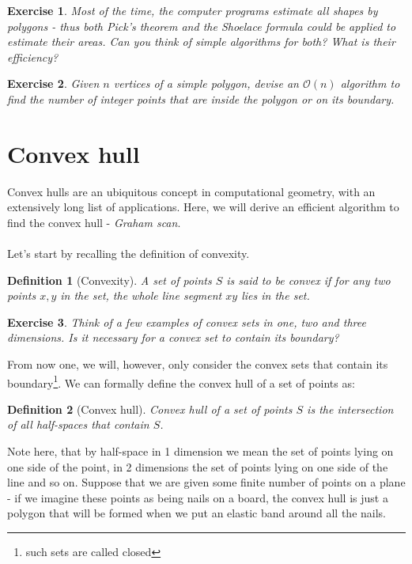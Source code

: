 \documentclass{article}
\newtheorem*{definition}{Definition}
\newtheorem{exercise}{Exercise}
\begin{document}
\begin{exercise}
Most of the time, the computer programs estimate all shapes by polygons - thus both Pick's theorem and the Shoelace formula could be applied to estimate their areas. Can you think of simple algorithms for both? What is their efficiency?
\end{exercise}

\begin{exercise}
Given $n$ vertices of a simple polygon, devise an $\mathcal{O}(n)$ algorithm to find the number of integer points that are inside the polygon or on its boundary.
\end{exercise}

\section*{Convex hull}
Convex hulls are an ubiquitous concept in computational geometry, with an extensively long list of applications. Here, we will derive an efficient algorithm to find the convex hull - \textit{Graham scan}. \\\\
\noindent Let's start by recalling the definition of convexity.

\begin{definition}[Convexity]
A set of points $S$ is said to be \textit{convex} if for any two points $x, y$ in the set, the whole line segment $xy$ lies in the set.
\end{definition}

\begin{exercise}
Think of a few examples of convex sets in one, two and three dimensions. Is it necessary for a convex set to contain its boundary?
\end{exercise}

\noindent From now one, we will, however, only consider the convex sets that contain its boundary\footnote{such sets are called closed}. We can formally define the convex hull of a set of points as:

\begin{definition}[Convex hull]
Convex hull of a set of points $S$ is the intersection of all half-spaces that contain $S$.
\end{definition}

\noindent Note here, that by half-space in 1 dimension we mean the set of points lying on one side of the point, in 2 dimensions the set of points lying on one side of the line and so on. Suppose that we are given some finite number of points on a plane - if we imagine these points as being nails on a board, the convex hull is just a polygon that will be formed when we put an elastic band around all the nails.
\end{document}
